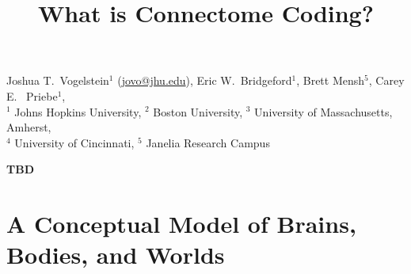 \documentclass[11pt]{article}
\title{What is Connectome Coding?
}
\begin{document}
\maketitle
\noindent\parbox{0.9\textwidth}{
\normalsize\color{lgray} Joshua T.~Vogelstein$^1$ (\url{jovo@jhu.edu}),
Eric W.~Bridgeford$^1$, 
Brett Mensh$^5$, 
Carey E. ~Priebe$^1$, 
\\
$^1$ Johns Hopkins University, $^2$ Boston University, $^3$ University of Massachusetts, Amherst, \\ $^4$ University of Cincinnati, $^5$ Janelia Research Campus
}
\thispagestyle{empty}
\medskip
\vspace{10pt}


\noindent
\textbf{TBD
}




\section{A Conceptual Model of Brains, Bodies, and Worlds}
\end{document}
